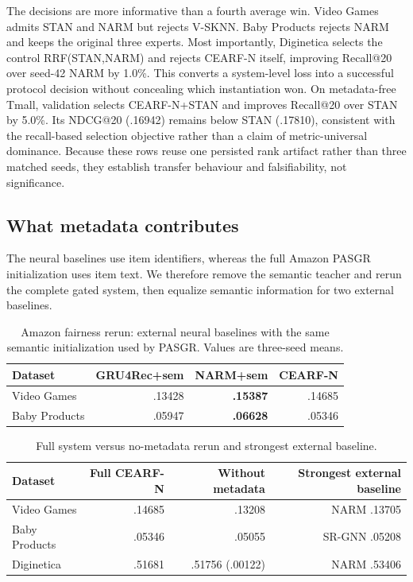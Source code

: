 \documentclass[runningheads]{llncs}
\newcommand{\method}{CEARF-N}
\begin{document}
The decisions are more informative than a fourth average win. Video Games
admits STAN and NARM but rejects V-SKNN. Baby Products rejects NARM and keeps
the original three experts. Most importantly, Diginetica selects the control
RRF(STAN,NARM) and rejects \method{} itself, improving Recall@20 over
seed-42 NARM by 1.0\%. This converts a system-level loss into a successful
protocol decision without concealing which instantiation won. On
metadata-free Tmall, validation selects \method{}+STAN and improves Recall@20
over STAN by 5.0\%. Its NDCG@20
(.16942) remains below STAN (.17810), consistent with the recall-based
selection objective rather than a claim of metric-universal dominance.
Because these rows reuse one persisted rank artifact rather than three matched
seeds, they establish transfer behaviour and falsifiability, not significance.

\subsection{What metadata contributes}
The neural baselines use item identifiers, whereas the full Amazon PASGR
initialization uses item text. We therefore remove the semantic teacher and
rerun the complete gated system, then equalize semantic information for two
external baselines.

\begin{table}[t]
\caption{Amazon fairness rerun: external neural baselines with the same
semantic initialization used by PASGR. Values are three-seed means.}
\label{tab:semantic-fairness}\centering\small
\begin{tabular}{lrrr}
\toprule Dataset & GRU4Rec+sem & NARM+sem & \method{} \\
\midrule
Video Games & .13428 & \textbf{.15387} & .14685 \\
Baby Products & .05947 & \textbf{.06628} & .05346 \\
\bottomrule
\end{tabular}
\end{table}

\begin{table}[t]
\caption{Full system versus no-metadata rerun and strongest external baseline.}
\label{tab:nometa}\centering\small
\begin{tabular}{lrrr}
\toprule Dataset & Full \method{} & Without metadata & Strongest external baseline \\
\midrule
Video Games & .14685 & .13208 & NARM .13705 \\
Baby Products & .05346 & .05055 & SR-GNN .05208 \\
Diginetica & .51681 & .51756 (.00122) & NARM .53406 \\
\bottomrule
\end{tabular}
\end{table}
\end{document}
